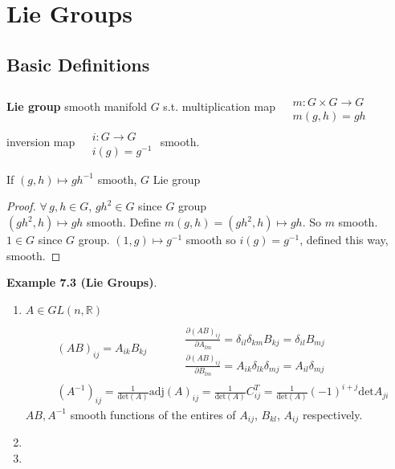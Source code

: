 \section{Lie Groups}


\subsection*{Basic Definitions}

\textbf{Lie group} smooth manifold $G$ s.t. multiplication map $\begin{aligned} & \quad \\ 
  & m : G \times G \to G \\
  & m(g,h) = gh \end{aligned}$ \\
inversion map $\begin{aligned} & \quad \\ 
  & i : G \to G \\
  & i(g) = g^{-1} \end{aligned}$ 
smooth.

\begin{proposition}[7.1]
If $(g,h) \mapsto gh^{-1}$ smooth, $G$ Lie group
\end{proposition}
\begin{proof}
  $\forall \, g,h \in G$, $gh^2 \in G$ since $G$ group \\
$(gh^2,h) \mapsto gh$ smooth.  Define $m(g,h) = (gh^2,h) \mapsto gh$.  So $m$ smooth.  \\
$1\in G$ since $G$ group.  $(1,g) \mapsto g^{-1}$ smooth so $i(g) = g^{-1}$, defined this way, smooth.  
\end{proof}

\textbf{Example 7.3 (Lie Groups)}.  
\begin{enumerate}
\item[(a)]$A \in GL(n,\mathbb{R})$
\[
\begin{aligned}
  & (AB)_{ij} = A_{ik} B_{kj} \quad \quad \, \begin{aligned} & \quad \\ 
    & \frac{ \partial (AB)_{ij} }{ \partial A_{lm} } = \delta_{il} \delta_{km} B_{kj} = \delta_{il} B_{mj} \\ 
    & \frac{ \partial (AB)_{ij} }{ \partial B_{lm} } = A_{ik} \delta_{lk} \delta_{mj} = A_{il} \delta_{mj} \end{aligned} \\
  & (A^{-1})_{ij} = \frac{1}{ \text{det}(A)} \text{adj}(A)_{ij} = \frac{1}{ \text{det}(A) } C^T_{ij} = \frac{1}{ \text{det}(A)}(-1)^{i+j}\text{det}A_{ji}
\end{aligned}
\]
$AB,A^{-1}$ smooth functions of the entires of $A_{ij}$, $B_{kl}$, $A_{ij}$ respectively.
\item[(b)]
\item[(c)]
\end{enumerate}

